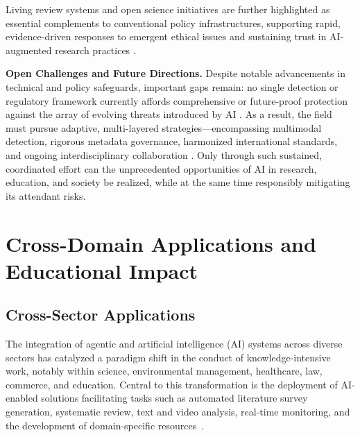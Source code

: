 Living review systems and open science initiatives are further highlighted as essential complements to conventional policy infrastructures, supporting rapid, evidence-driven responses to emergent ethical issues and sustaining trust in AI-augmented research practices \cite{ref43,ref61,ref70,ref84,ref86,ref95,ref100,ref101,ref106,ref110}.

\textbf{Open Challenges and Future Directions.}  
Despite notable advancements in technical and policy safeguards, important gaps remain: no single detection or regulatory framework currently affords comprehensive or future-proof protection against the array of evolving threats introduced by AI \cite{ref14,ref24,ref85,ref92,ref95,ref97}. As a result, the field must pursue adaptive, multi-layered strategies—encompassing multimodal detection, rigorous metadata governance, harmonized international standards, and ongoing interdisciplinary collaboration \cite{ref9,ref10,ref31,ref41,ref53,ref61,ref70,ref80,ref81,ref95,ref101,ref106,ref110}. Only through such sustained, coordinated effort can the unprecedented opportunities of AI in research, education, and society be realized, while at the same time responsibly mitigating its attendant risks.

\section{Cross-Domain Applications and Educational Impact}

\subsection{Cross-Sector Applications}

The integration of agentic and artificial intelligence (AI) systems across diverse sectors has catalyzed a paradigm shift in the conduct of knowledge-intensive work, notably within science, environmental management, healthcare, law, commerce, and education. Central to this transformation is the deployment of AI-enabled solutions facilitating tasks such as automated literature survey generation, systematic review, text and video analysis, real-time monitoring, and the development of domain-specific resources~\cite{ref6,ref7,ref8,ref9,ref10,ref14,ref25,ref26,ref27,ref28,ref29,ref30,ref40,ref45,ref58,ref59,ref76,ref80,ref86,ref88,ref91,ref92,ref93,ref94,ref95,ref96,ref97,ref98,ref99,ref100,ref104,ref109,ref110,ref111,ref112,ref113,ref114,ref115}. 

